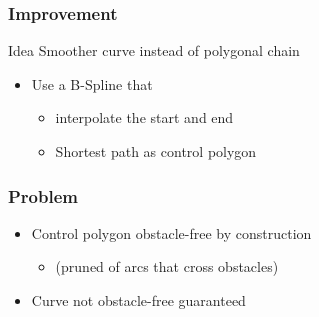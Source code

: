 \begin{frame}
  \frametitle{Improvement}
  \begin{block}{Idea}
    \alert{Smoother} curve instead of polygonal chain
  \end{block}
  \pause
  \begin{itemize}
  \item Use a \alert{B-Spline} that \pause
    \begin{itemize}
    \item \alert{interpolate} the start and end\pause
    \item Shortest path as \alert{control polygon}
    \end{itemize}
  \end{itemize}
\end{frame}

\begin{frame}
  \frametitle{Problem}  
  \begin{itemize}
  \item \alert{Control polygon} obstacle-free by
    construction\pause
    \begin{itemize}
    \item (pruned of arcs that cross obstacles)\pause
    \end{itemize}
  \item \alert{Curve} not obstacle-free guaranteed\pause
  \end{itemize}
  \begin{center}
  \end{center}
\end{frame}

